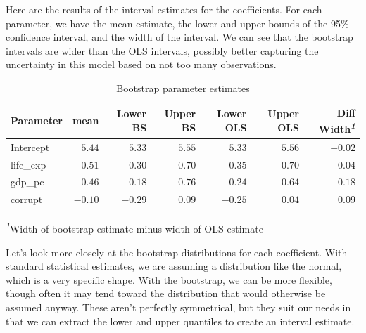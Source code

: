 \documentclass[
  letterpaper,
]{krantz}
\begin{document}
Here are the results of the interval estimates for the coefficients. For
each parameter, we have the mean estimate, the lower and upper bounds of
the 95\% confidence interval, and the width of the interval. We can see
that the bootstrap intervals are wider than the OLS intervals, possibly
better capturing the uncertainty in this model based on not too many
observations.

\setlength{\LTpost}{0mm}

\begin{longtable}{lrrrrrr}

\caption{\label{tbl-bootstrap}Bootstrap parameter estimates}

\tabularnewline

\toprule
Parameter & mean & Lower BS & Upper BS & Lower OLS & Upper OLS & Diff Width\textsuperscript{\textit{1}} \\ 
\midrule\addlinespace[2.5pt]
Intercept & \textcolor[HTML]{404040}{$5.44$} & \textcolor[HTML]{404040}{$5.33$} & \textcolor[HTML]{404040}{$5.55$} & \textcolor[HTML]{404040}{$5.33$} & \textcolor[HTML]{404040}{$5.56$} & \textcolor[HTML]{404040}{$-0.02$} \\ 
life\_exp & \textcolor[HTML]{404040}{$0.51$} & \textcolor[HTML]{404040}{$0.30$} & \textcolor[HTML]{404040}{$0.70$} & \textcolor[HTML]{404040}{$0.35$} & \textcolor[HTML]{404040}{$0.70$} & \textcolor[HTML]{404040}{$0.04$} \\ 
gdp\_pc & \textcolor[HTML]{404040}{$0.46$} & \textcolor[HTML]{404040}{$0.18$} & \textcolor[HTML]{404040}{$0.76$} & \textcolor[HTML]{404040}{$0.24$} & \textcolor[HTML]{404040}{$0.64$} & \textcolor[HTML]{404040}{$0.18$} \\ 
corrupt & \textcolor[HTML]{404040}{$-0.10$} & \textcolor[HTML]{404040}{$-0.29$} & \textcolor[HTML]{404040}{$0.09$} & \textcolor[HTML]{404040}{$-0.25$} & \textcolor[HTML]{404040}{$0.04$} & \textcolor[HTML]{404040}{$0.09$} \\ 
\bottomrule

\end{longtable}

\begin{minipage}{\linewidth}
\textsuperscript{\textit{1}}Width of bootstrap estimate minus width of OLS estimate\\
\end{minipage}

Let's look more closely at the bootstrap distributions for each
coefficient. With standard statistical estimates, we are assuming a
distribution like the normal, which is a very specific shape. With the
bootstrap, we can be more flexible, though often it may tend toward the
distribution that would otherwise be assumed anyway. These aren't
perfectly symmetrical, but they suit our needs in that we can extract
the lower and upper quantiles to create an interval estimate.
\end{document}
